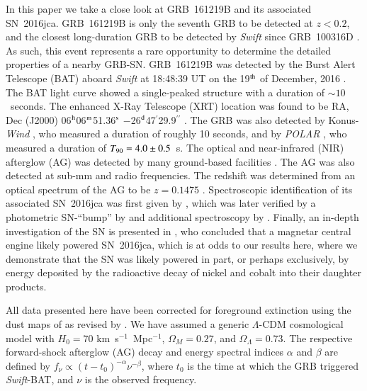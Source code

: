 \documentclass[traditabstract,longauth]{aa}
\begin{document}
In this paper we take a close look at GRB~161219B and its associated SN~2016jca.  GRB~161219B is only the seventh GRB to be detected at $z<0.2$, and the closest long-duration GRB to be detected by \emph{Swift} since GRB~100316D \citep{Starling11}.  As such, this event represents a rare opportunity to determine the detailed properties of a nearby GRB-SN.  GRB~161219B was detected by the Burst Alert Telescope (BAT) aboard \emph{Swift} \citep{Gehrels04} at 18:48:39 UT on the 19$^{\rm th}$ of December, 2016 \citep{Dai16}.  The BAT light curve showed a single-peaked structure with a duration of $\sim 10$~seconds.  The enhanced X-Ray Telescope (XRT) location was found to be RA, Dec (J2000) 06$^{\rm h}$06$^{\rm m}$51.36$^{\rm s}$ $-$26$^{\rm d}$47$^{\prime}$29.9$^{\prime\prime}$ \citep{Beardmore16}.  The GRB was also detected by Konus-\emph{Wind} \citep{Frederiks16}, who measured a duration of roughly 10 seconds, and by \emph{POLAR} \citep{Xiao16}, who measured a duration of $T_{\rm 90} = 4.0 \pm 0.5$~s.  The optical and near-infrared (NIR) afterglow (AG) was detected by many ground-based facilities \citep{Buckley16,Fong16,Fujiwara16,Guidorzi16,Kruehler16,Marshall16,Martin16,Mazaeva16}.  The AG was also detected at sub-mm \citep{Laskar16}  and radio \citep{Alexander16,Nayana16} frequencies. The redshift was determined from an optical spectrum of the AG to be $z = 0.1475$ \citep{Tanvir16,deUgarte16}.  Spectroscopic identification of its associated SN~2016jca was first given by \citet{deUgarte16}, which was later verified by a photometric SN-``bump'' by \citet{Volnova17} and additional spectroscopy by \citep{Chen17}. Finally, an in-depth investigation of the SN is presented in \citet{Ashall17}, who concluded that a magnetar central engine likely powered SN~2016jca, which is at odds to our results here, where we demonstrate that the SN was likely powered in part, or perhaps exclusively, by energy deposited by the radioactive decay of nickel and cobalt into their daughter products.



All data presented here have been corrected for foreground extinction using the dust maps of \citet{Schlegel98} as revised by \citet{SchFink11}.  We have assumed a generic $\Lambda$-CDM cosmological model with $H_0 = 70$ km~s$^{-1}$~Mpc$^{-1}$, $\Omega_M = 0.27$, and $\Omega_{\Lambda} = 0.73$.  The respective forward-shock afterglow (AG) decay and energy spectral indices $\alpha$ and $\beta$ are defined by $f_{\nu} \propto (t - t_{0})^{-\alpha}\nu^{-\beta}$, where $t_{0}$ is the time at which the GRB triggered \emph{Swift}-BAT, and $\nu$ is the observed frequency. 
\end{document}
